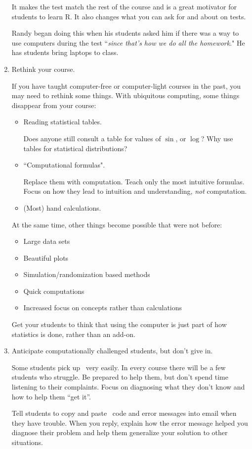 \begin{enumerate}
It makes the test match the rest of the course and is a great motivator for students
to learn R.  It also changes what you can ask for and about on tests.

Randy began doing this when his students asked him if there was a way to use computers
during the test ``\emph{since that's how we do all the homework}."  He has students 
bring laptops to class.  

\item
Rethink your course.

If you have taught computer-free or computer-light courses in the past, you may need
to rethink some things.  With ubiquitous computing, some things disappear from your 
course:
\begin{itemize}
\item
Reading statistical tables.  

Does anyone still consult a table for values of $\sin$,
or $\log$?  Why use tables for statistical distributions?
\item
``Computational formulas".

Replace them with computation.  Teach only the most intuitive formulas. Focus on
how they lead to intuition and understanding, \emph{not} computation.

\item
(Most) hand calculations.

\end{itemize}
At the same time, other things become possible that were not before:
\begin{itemize}
\item
Large data sets
\item
Beautiful plots
\item
Simulation/randomization based methods
\item
Quick computations
\item
Increased focus on concepts rather than calculations
\end{itemize}
Get your students to think that using the computer is just part of how statistics is
done, rather than an add-on.  

\item
Anticipate computationally challenged students, but don't give in.

Some students pick up \R\ very easily.  In every course there will be a few students who
struggle.  Be prepared to help them, but don't  spend time listening to their complaints.
Focus on diagnosing what they don't know and how to help them ``get it''.

Tell students to copy and paste \R\ code and error messages into email when they
have trouble.  When you reply, explain how the error message helped you diagnose their
problem and help them generalize your solution to other situations.
\end{enumerate}

